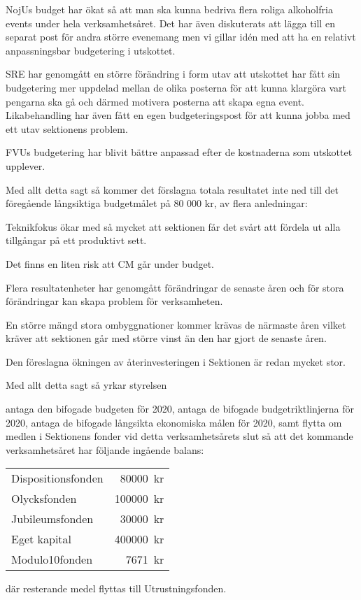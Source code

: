 \documentclass[../_main/handlingar.tex]{subfiles}
\begin{document}
NojUs budget har ökat så att man ska kunna bedriva flera roliga alkoholfria events under hela verksamhetsåret. Det har även diskuterats att lägga till en separat post för andra större evenemang men vi gillar idén med att ha en relativt anpassningsbar budgetering i utskottet.

SRE har genomgått en större förändring i form utav att utskottet har fått sin budgetering mer uppdelad mellan de olika posterna för att kunna klargöra vart pengarna ska gå och därmed motivera posterna att skapa egna event. 
Likabehandling har även fått en egen budgeteringspost för att kunna jobba med ett utav sektionens problem.

FVUs budgetering har blivit bättre anpassad efter de kostnaderna som utskottet upplever.

Med allt detta sagt så kommer det förslagna totala resultatet inte ned till det föregående långsiktiga budgetmålet på 80 000 kr, av flera anledningar:

\begin{tightdashlist}
    \item Teknikfokus ökar med så mycket att sektionen får det svårt att fördela ut alla tillgångar på ett produktivt sett.
    \item Det finns en liten risk att CM går under budget.
    \item Flera resultatenheter har genomgått förändringar de senaste åren och för stora förändringar kan skapa problem för verksamheten.
    \item En större mängd stora ombyggnationer kommer krävas de närmaste åren vilket kräver att sektionen går med större vinst än den har gjort de senaste åren.
    \item Den föreslagna ökningen av återinvesteringen i Sektionen är redan mycket stor.
\end{tightdashlist}

Med allt detta sagt så yrkar styrelsen


\begin{attsatser}
    \att antaga den bifogade budgeten för 2020, 
    \att antaga de bifogade budgetriktlinjerna för 2020,
    \att antaga de bifogade långsikta ekonomiska målen för 2020, samt
    \att flytta om medlen i Sektionens fonder vid detta verksamhetsårets slut så att det kommande verksamhetsåret har följande ingående balans:\par
    \begin{tabular}{l r}
        Dispositionsfonden & \SI{80000}{kr}\\
        Olycksfonden & \SI{100000}{kr}\\
        Jubileumsfonden & \SI{30000}{kr}\\
        Eget kapital & \SI{400000}{kr}\\
        Modulo10fonden & \SI{7671}{kr}\\
    \end{tabular}\par
    där resterande medel flyttas till Utrustningsfonden.
\end{attsatser}
\end{document}
